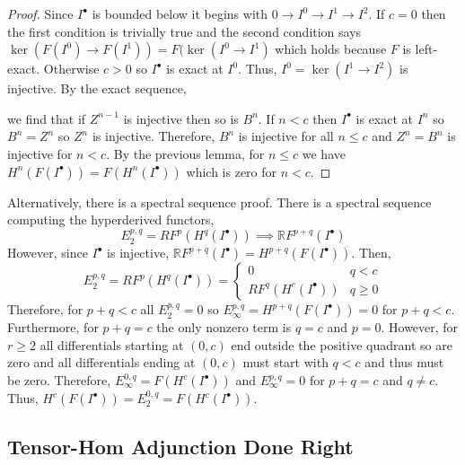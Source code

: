 \documentclass[12pt]{article}
\begin{document}
\begin{proof}
Since $I^\bullet$ is bounded below it begins with $0 \to I^0 \to I^1 \to I^2$. If $c = 0$ then the first condition is trivially true and the second condition says $\ker{(F(I^0) \to F(I^1))} = F(\ker{(I^0 \to I^1)}$ which holds because $F$ is left-exact. Otherwise $ c > 0$  so $I^\bullet$ is exact at $I^0$. Thus, $I^0 = \ker{(I^1 \to I^2)}$ is injective. By the exact sequence,
\begin{center}
\end{center}
we find that if $Z^{n-1}$ is injective then so is $B^{n}$. If $n < c$ then $I^\bullet$ is exact at $I^{n}$ so $B^{n} = Z^{n}$ so $Z^{n}$ is injective. Therefore, $B^n$ is injective for all $n \le c$ and $Z^n = B^n$ is injective for $n < c$. By the previous lemma, for $n \le c$ we have $H^n(F(I^\bullet)) = F(H^n(I^\bullet))$ which is zero for $n < c$.
\end{proof}

\begin{rmk}
Alternatively, there is a spectral sequence proof. There is a spectral sequence computing the hyperderived functors,
\[ E^{p,q}_2 = R F^p(H^q(I^\bullet)) \implies \mathbb{R} F^{p + q}(I^\bullet) \]
However, since $I^\bullet$ is injective, $\mathbb{R} F^{p + q}(I^\bullet) = H^{p + q}(F(I^\bullet))$. Then,
\[ E^{p, q}_2 = R F^p(H^q(I^\bullet)) = 
\begin{cases}
0 & q < c
\\
R F^q(H^c(I^\bullet)) & q \ge 0
\end{cases} \]
Therefore, for $p + q < c$ all $E^{p,q}_2 = 0$ so $E^{p,q}_\infty = H^{p+q}(F(I^\bullet)) = 0$ for $p + q < c$. Furthermore, for $p + q = c$ the only nonzero term is $q = c$ and $p = 0$. However, for $r \ge 2$ all differentials starting at $(0, c)$ end outside the positive quadrant so are zero and all differentials ending at $(0, c)$ must start with $q < c$ and thus must be zero. Therefore, $E^{0,q}_{\infty} = F(H^c(I^\bullet))$ and $E^{p, q}_{\infty} = 0$ for $p + q = c$ and $q \neq c$. Thus, $H^c(F(I^\bullet)) = E^{0,q}_2 = F(H^c(I^\bullet))$. 
\end{rmk}

\subsection{Tensor-Hom Adjunction Done Right}
\end{document}
